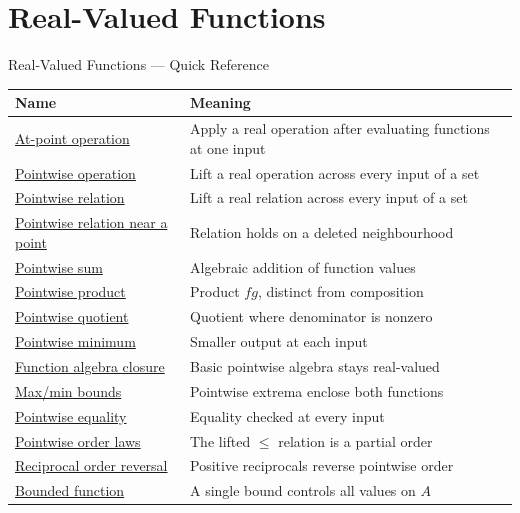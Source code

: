 \section{Real-Valued Functions}

\begin{toolkitbox}{Real-Valued Functions --- Quick Reference}
\small
\begin{tabular}{l l}
\toprule
\textbf{Name} & \textbf{Meaning} \\
\midrule
\hyperref[def:at-point-operation]{At-point operation} & Apply a real operation after evaluating functions at one input \\
\hyperref[def:pointwise-operation-on-set]{Pointwise operation} & Lift a real operation across every input of a set \\
\hyperref[def:pointwise-relation-on-set]{Pointwise relation} & Lift a real relation across every input of a set \\
\hyperref[def:pointwise-relation-near-point]{Pointwise relation near a point} & Relation holds on a deleted neighbourhood \\
\hyperref[def:pointwise-sum-of-functions]{Pointwise sum} & Algebraic addition of function values \\
\hyperref[def:pointwise-product-of-functions]{Pointwise product} & Product \(fg\), distinct from composition \\
\hyperref[def:pointwise-quotient-of-functions]{Pointwise quotient} & Quotient where denominator is nonzero \\
\hyperref[def:pointwise-minimum-of-two-functions]{Pointwise minimum} & Smaller output at each input \\
\hyperref[thm:function-algebra-closure]{Function algebra closure} & Basic pointwise algebra stays real-valued \\
\hyperref[prop:pointwise-max-min-bounds]{Max/min bounds} & Pointwise extrema enclose both functions \\
\hyperref[def:pointwise-equality-on-set]{Pointwise equality} & Equality checked at every input \\
\hyperref[thm:pointwise-order-laws]{Pointwise order laws} & The lifted \(\leq\) relation is a partial order \\
\hyperref[prop:reciprocal-order-reversal]{Reciprocal order reversal} & Positive reciprocals reverse pointwise order \\
\hyperref[def:function-bounded]{Bounded function} & A single bound controls all values on \(A\) \\

\end{tabular}
\end{toolkitbox}
